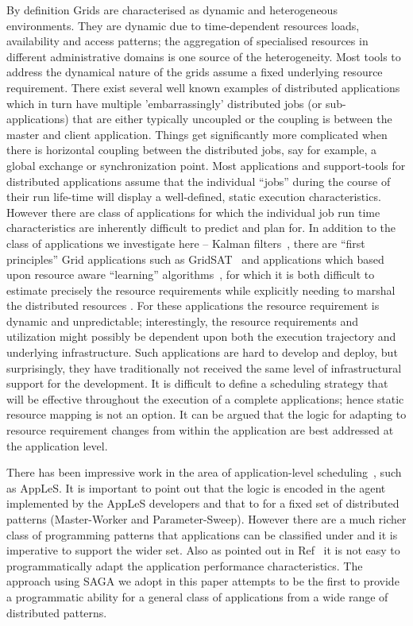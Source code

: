 \documentclass[conference,final]{IEEEtran}
\begin{document}
By definition Grids are characterised as dynamic and heterogeneous
environments.  They are dynamic due to time-dependent resources loads,
availability and access patterns; the aggregation of specialised
resources in different administrative domains is one source of the
heterogeneity.  Most tools to address the dynamical nature of the
grids assume a fixed underlying resource requirement.  There exist
several well known examples of distributed applications which in turn
have multiple 'embarrassingly' distributed jobs (or sub-applications)
that are either typically uncoupled or the coupling is between the
master and client application.  Things get significantly more
complicated when there is horizontal coupling between the distributed
jobs, say for example, a global exchange or synchronization point.
Most applications and support-tools for distributed applications
assume that the individual ``jobs'' during the course of their run
life-time will display a well-defined, static execution
characteristics.  However there are class of applications for which
the individual job run time characteristics are inherently difficult
to predict and plan for.  In addition to the class of applications we
investigate here -- Kalman filters~\cite{DataAssim, KalmanPaper},
there are ``first principles'' Grid applications such as
GridSAT~\cite{gridsat03} and applications which based upon resource
aware ``learning'' algorithms~\cite{ majority_voting}, for which it is
both difficult to estimate precisely the resource requirements while
explicitly needing to marshal the distributed resources . For these
applications the resource requirement is dynamic and unpredictable;
interestingly, the resource requirements and utilization might
possibly be dependent upon both the execution trajectory and
underlying infrastructure. Such applications are hard to develop and
deploy, but surprisingly, they have traditionally not received the
same level of infrastructural support for the development. It is
difficult to define a scheduling strategy that will be effective
throughout the execution of a complete applications; hence static
resource mapping is not an option.  It can be argued that the logic
for adapting to resource requirement changes from within the
application are best addressed at the application level.



There has been impressive work in the area of application-level
scheduling~\cite{apples03}, such as AppLeS. It is important to point
out that the logic is encoded in the agent implemented by the AppLeS
developers and that to for a fixed set of distributed patterns
(Master-Worker and Parameter-Sweep).  However there are a much richer
class of programming patterns that applications can be classified
under and it is imperative to support the wider set. Also as pointed
out in Ref~\cite{apples03} it is not easy to programmatically adapt
the application performance characteristics. The approach using SAGA
we adopt in this paper attempts to be the first to provide a
programmatic ability for a general class of applications from a wide
range of distributed patterns.
\end{document}

